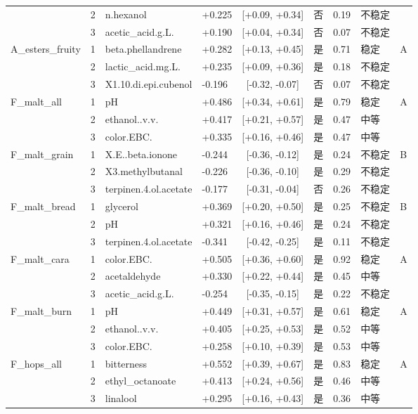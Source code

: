 \begin{longtable}{llllcccll}
 & 2 & n.hexanol & +0.225 & [+0.09, +0.34] & 否 & 0.19 & 不稳定 &  \\
 & 3 & acetic\_acid.g.L. & +0.190 & [+0.04, +0.34] & 否 & 0.07 & 不稳定 &  \\
A\_esters\_fruity & 1 & beta.phellandrene & +0.282 & [+0.13, +0.45] & 是 & 0.71 & 稳定 & A \\
 & 2 & lactic\_acid.mg.L. & +0.235 & [+0.09, +0.36] & 是 & 0.18 & 不稳定 &  \\
 & 3 & X1.10.di.epi.cubenol & -0.196 & [-0.32, -0.07] & 否 & 0.07 & 不稳定 &  \\
F\_malt\_all & 1 & pH & +0.486 & [+0.34, +0.61] & 是 & 0.79 & 稳定 & A \\
 & 2 & ethanol..v.v. & +0.417 & [+0.21, +0.57] & 是 & 0.47 & 中等 &  \\
 & 3 & color.EBC. & +0.335 & [+0.16, +0.46] & 是 & 0.47 & 中等 &  \\
F\_malt\_grain & 1 & X.E..beta.ionone & -0.244 & [-0.36, -0.12] & 是 & 0.24 & 不稳定 & B \\
 & 2 & X3.methylbutanal & -0.226 & [-0.36, -0.10] & 是 & 0.29 & 不稳定 &  \\
 & 3 & terpinen.4.ol.acetate & -0.177 & [-0.31, -0.04] & 否 & 0.26 & 不稳定 &  \\
F\_malt\_bread & 1 & glycerol & +0.369 & [+0.20, +0.50] & 是 & 0.25 & 不稳定 & B \\
 & 2 & pH & +0.321 & [+0.16, +0.46] & 是 & 0.24 & 不稳定 &  \\
 & 3 & terpinen.4.ol.acetate & -0.341 & [-0.42, -0.25] & 是 & 0.11 & 不稳定 &  \\
F\_malt\_cara & 1 & color.EBC. & +0.505 & [+0.36, +0.60] & 是 & 0.92 & 稳定 & A \\
 & 2 & acetaldehyde & +0.330 & [+0.22, +0.44] & 是 & 0.45 & 中等 &  \\
 & 3 & acetic\_acid.g.L. & -0.254 & [-0.35, -0.15] & 是 & 0.22 & 不稳定 &  \\
F\_malt\_burn & 1 & pH & +0.449 & [+0.31, +0.57] & 是 & 0.61 & 稳定 & A \\
 & 2 & ethanol..v.v. & +0.405 & [+0.25, +0.53] & 是 & 0.52 & 中等 &  \\
 & 3 & color.EBC. & +0.258 & [+0.10, +0.39] & 是 & 0.53 & 中等 &  \\
F\_hops\_all & 1 & bitterness & +0.552 & [+0.39, +0.67] & 是 & 0.83 & 稳定 & A \\
 & 2 & ethyl\_octanoate & +0.413 & [+0.24, +0.56] & 是 & 0.46 & 中等 &  \\
 & 3 & linalool & +0.295 & [+0.16, +0.43] & 是 & 0.36 & 中等 &  \\

\end{longtable}
